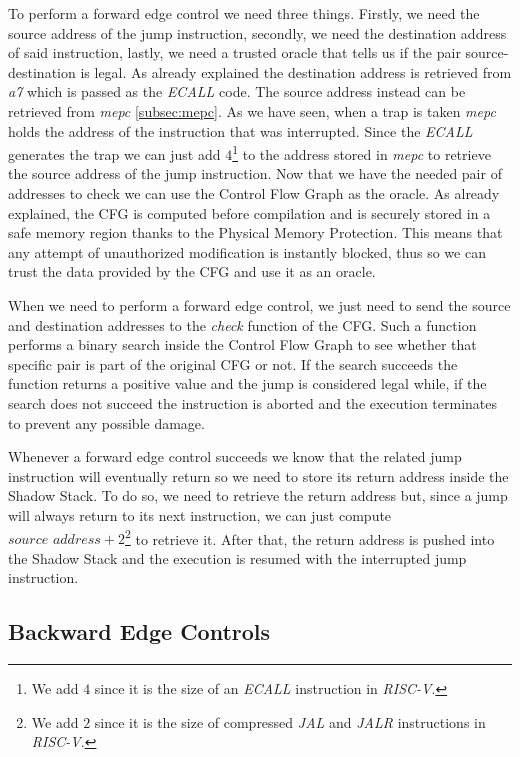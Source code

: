 To perform a forward edge control we need three things. Firstly, we need the source
address of the jump instruction, secondly, we need the destination address of said
instruction, lastly, we need a trusted oracle that tells us if the pair source-destination
is legal. As already explained the destination address is retrieved from \textit{a7}
which is passed as the \textit{ECALL} code. The source address instead can be retrieved
from \textit{mepc} \ref{subsec:mepc}. As we have seen, when a trap is taken
\textit{mepc} holds the address of the instruction that was interrupted. Since
the \textit{ECALL} generates the trap we can just add $4$\footnote{We add $4$
since it is the size of an \textit{ECALL} instruction in \textit{RISC-V}.} to
the address stored in \textit{mepc} to retrieve the source address of the jump instruction.
Now that we have the needed pair of addresses to check we can use the Control
Flow Graph as the oracle. As already explained, the CFG is computed before
compilation and is securely stored in a safe memory region thanks to the
Physical Memory Protection. This means that any attempt of unauthorized modification
is instantly blocked, thus so we can trust the data provided by the CFG and use
it as an oracle.

When we need to perform a forward edge control, we just need to send the source and
destination addresses to the \textit{check} function of the CFG. Such a function
performs a binary search inside the Control Flow Graph to see whether that specific
pair is part of the original CFG or not. If the search succeeds the function
returns a positive value and the jump is considered legal while, if the search does
not succeed the instruction is aborted and the execution terminates to prevent any
possible damage.

Whenever a forward edge control succeeds we know that the related jump instruction
will eventually return so we need to store its return address inside the Shadow Stack.
To do so, we need to retrieve the return address but, since a jump will always
return to its next instruction, we can just compute $\textit{source address}+ 2$\footnote{We
add $2$ since it is the size of compressed \textit{JAL} and \textit{JALR}
instructions in \textit{RISC-V}.} to retrieve it. After that, the return address
is pushed into the Shadow Stack and the execution is resumed with the
interrupted jump instruction.

\subsection{Backward Edge Controls}
\label{subsec:backward}

